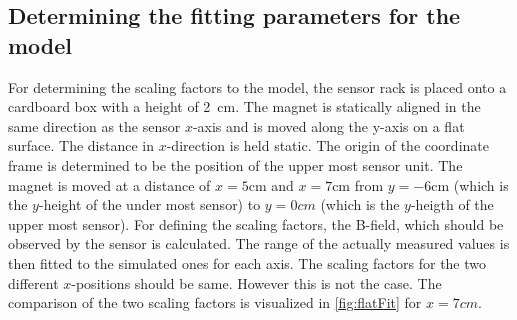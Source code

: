 

\subsection{Determining the fitting parameters for the model} \label{subsec:resModelFit}

For determining the scaling factors to the model, the sensor rack is placed onto a cardboard box with a height of \SI{2}{\cm}. The magnet is statically aligned in the same direction as the sensor $ x $-axis and is moved along the y-axis on a flat surface. The distance in $ x $-direction is held static. The origin of the coordinate frame is determined to be the position of the upper most sensor unit. The magnet is moved at a distance of $ x=5\si{\cm} $ and $ x=7\si{\cm} $ from $ y=-6\si{\cm} $ (which is the $ y $-height of the under most sensor) to $ y=0\si{cm} $ (which is the $ y $-heigth of the upper most sensor). For defining the scaling factors, the B-field, which should be observed by the sensor is calculated. The range of the actually measured values is then fitted to the simulated ones for each axis. The scaling factors for the two different $ x $-positions should be same. However this is not the case. The comparison of the two scaling factors is visualized in \ref{fig:flatFit} for $ x=7\si{cm} $.

